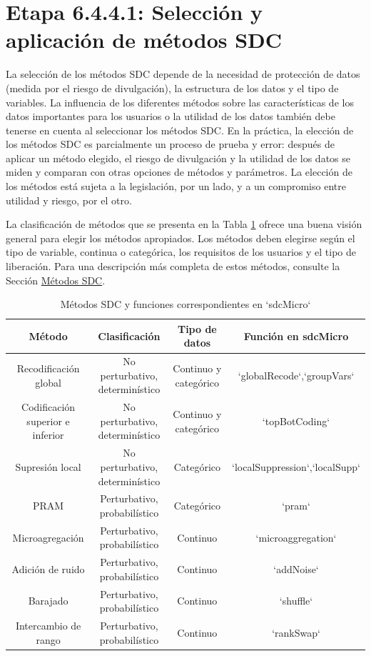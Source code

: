 \documentclass[]{book}
\theoremstyle{definition}
\theoremstyle{definition}
\theoremstyle{definition}
\theoremstyle{definition}
\theoremstyle{remark}
\begin{document}
\hypertarget{etapa-6.4.4.1-selecciuxf3n-y-aplicaciuxf3n-de-muxe9todos-sdc}{%
\section{Etapa 6.4.4.1: Selección y aplicación de métodos SDC}\label{etapa-6.4.4.1-selecciuxf3n-y-aplicaciuxf3n-de-muxe9todos-sdc}}

La selección de los métodos SDC depende de la necesidad de protección de datos (medida por el riesgo de divulgación), la estructura de los datos y el tipo de variables. La influencia de los diferentes métodos sobre las características de los datos importantes para los usuarios o la utilidad de los datos también debe tenerse en cuenta al seleccionar los métodos SDC. En la práctica, la elección de los métodos SDC es parcialmente un proceso de prueba y error: después de aplicar un método elegido, el riesgo de divulgación y la utilidad de los datos se miden y comparan con otras opciones de métodos y parámetros. La elección de los métodos está sujeta a la legislación, por un lado, y a un compromiso entre utilidad y riesgo, por el otro.

La clasificación de métodos que se presenta en la Tabla \ref{tab:tabProc2} ofrece una buena visión general para elegir los métodos apropiados. Los métodos deben elegirse según el tipo de variable, continua o categórica, los requisitos de los usuarios y el tipo de liberación. Para una descripción más completa de estos métodos, consulte la Sección \protect\hyperlink{muxe9todos-sdc}{Métodos SDC}.

\begin{table}

\caption{\label{tab:tabProc2}Métodos SDC y funciones correspondientes en `sdcMicro`}
\centering
\begin{tabular}[t]{c|c|c|c}
\hline
Método & Clasificación & Tipo de datos & Función en sdcMicro\\
\hline
Recodificación global & No perturbativo, determinístico & Continuo y categórico & `globalRecode`,`groupVars`\\
\hline
Codificación superior e inferior & No perturbativo, determinístico & Continuo y categórico & `topBotCoding`\\
\hline
Supresión local & No perturbativo, determinístico & Categórico & `localSuppression`,`localSupp`\\
\hline
PRAM & Perturbativo, probabilístico & Categórico & `pram`\\
\hline
Microagregación & Perturbativo, probabilístico & Continuo & `microaggregation`\\
\hline
Adición de ruido & Perturbativo, probabilístico & Continuo & `addNoise`\\
\hline
Barajado & Perturbativo, probabilístico & Continuo & `shuffle`\\
\hline
Intercambio de rango & Perturbativo, probabilístico & Continuo & `rankSwap`\\
\hline
\end{tabular}
\end{table}
\end{document}
